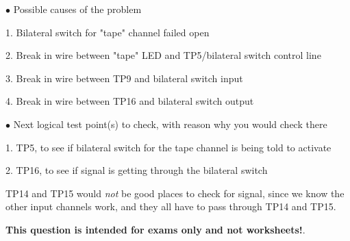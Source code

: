 \medskip
\goodbreak
\item{$\bullet$} Possible causes of the problem
\item{1.} Bilateral switch for "tape" channel failed open
\item{2.} Break in wire between "tape" LED and TP5/bilateral switch control line
\item{3.} Break in wire between TP9 and bilateral switch input
\item{4.} Break in wire between TP16 and bilateral switch output
\medskip

\medskip
\goodbreak
\item{$\bullet$} Next logical test point(s) to check, with reason why you would check there
\item{1.} TP5, to see if bilateral switch for the tape channel is being told to activate
\item{2.} TP16, to see if signal is getting through the bilateral switch
\medskip

TP14 and TP15 would {\it not} be good places to check for signal, since we know the other input channels work, and they all have to pass through TP14 and TP15.







{\bf This question is intended for exams only and not worksheets!}.




